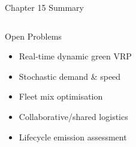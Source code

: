 \documentclass[aspectratio=169,10pt]{beamer}
\begin{document}
\begin{frame}[allowframebreaks]{Chapter 15 Summary}
\begin{columns}[t]
    \begin{block}{Open Problems}
      \begin{itemize}
        \item Real-time dynamic green VRP
        \item Stochastic demand \& speed
        \item Fleet mix optimisation
        \item Collaborative/shared logistics
        \item Lifecycle emission assessment
      \end{itemize}
    \end{block}
  \end{columns}
\end{frame}
\end{document}
